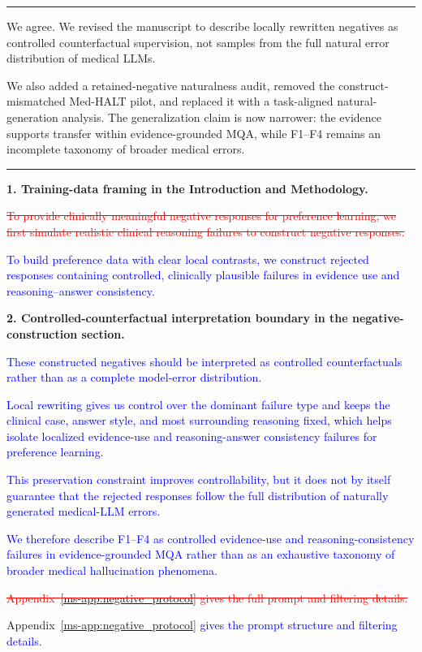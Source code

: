 \documentclass[12pt]{article}
\newcommand{\deleted}[1]{\textcolor{red}{\sout{#1}}}
\newcommand{\added}[1]{\textcolor{blue}{#1}}
\newcommand{\responseheading}[1]{%
    \vspace{0.24cm}
    \par\noindent{\large\bfseries #1}\par
    \vspace{0.03cm}
    \noindent\rule{\linewidth}{0.35pt}\par
    \vspace{0.06cm}
    \noindent\ignorespaces
}
\begin{document}
\responseheading{Response and Revision Summary}
We agree. We revised the manuscript to describe locally rewritten negatives as
controlled counterfactual supervision, not samples from the full natural error
distribution of medical LLMs.

We also added a retained-negative naturalness audit, removed the construct-mismatched
Med-HALT pilot, and replaced it with a task-aligned natural-generation analysis. The
generalization claim is now narrower: the evidence supports transfer within
evidence-grounded MQA, while F1--F4 remains an incomplete taxonomy of broader medical
errors.


\responseheading{Revision Details}
\textbf{1. Training-data framing in the Introduction and Methodology.}
\begin{displayquote}
\deleted{To provide clinically meaningful negative responses for preference learning, we first simulate realistic clinical reasoning failures to construct negative responses.}

\added{To build preference data with clear local contrasts, we construct rejected responses containing controlled, clinically plausible failures in evidence use and reasoning--answer consistency.}
\end{displayquote}

\textbf{2. Controlled-counterfactual interpretation boundary in the negative-construction section.}
\begin{displayquote}
\added{These constructed negatives should be interpreted as controlled counterfactuals rather than as a complete model-error distribution.}

\added{Local rewriting gives us control over the dominant failure type and keeps the clinical case, answer style, and most surrounding reasoning fixed, which helps isolate localized evidence-use and reasoning-answer consistency failures for preference learning.}

\added{This preservation constraint improves controllability, but it does not by itself guarantee that the rejected responses follow the full distribution of naturally generated medical-LLM errors.}

\added{We therefore describe F1--F4 as controlled evidence-use and reasoning-consistency failures in evidence-grounded MQA rather than as an exhaustive taxonomy of broader medical hallucination phenomena.}

\deleted{Appendix~\ref*{ms-app:negative_protocol} gives the full prompt and filtering details.}

Appendix~\ref*{ms-app:negative_protocol} \added{gives the prompt structure and filtering details.}
\end{displayquote}
\end{document}
